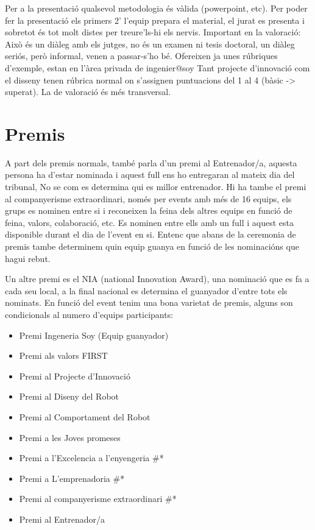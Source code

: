 \documentclass{article}
\begin{document}
\hfill \break\hfill \break
Per a la presentació qualsevol metodologia és vàlida (powerpoint, etc). Per poder fer la presentació els primers 2' l’equip prepara el material, el jurat es presenta i sobretot és tot molt distes per treure'ls-hi els nervis. Important en la valoració: Això és un diàleg amb els jutges, no és un examen ni tesis doctoral, un diàleg seriós, però informal, venen a passar-s’ho bé. 
\hfill \break\hfill \break
Ofereixen ja unes rúbriques d’exemple, estan en l’àrea privada de ingenier@soy
\hfill \break\hfill \break
Tant projecte d’innovació com el disseny tenen rúbrica normal on s'assignen puntuacions del 1 al 4 (bàsic -> superat). La de valoració és més transversal.

\section{Premis}


A part dels premis normals, també parla d’un premi al Entrenador/a, aquesta persona ha d’estar nominada i aquest full ens ho entregaran al mateix dia del tribunal, No se com es determina qui es millor entrenador. 
\hfill \break\hfill \break
Hi ha tambe el premi al companyerisme extraordinari, només per events amb més de 16 equips, els grups es nominen entre si i reconeixen la feina dels altres equips en funció de feina, valors, colaboració, etc. Es nominen entre ells amb un full i aquest esta disponible durant el dia de l’event en si. Entenc que abans de la ceremonia de premis tambe determinem quin equip guanya en funció de les nominacións que hagui rebut. 

Un altre premi es el NIA (national Innovation Award), una nominació que es fa a cada seu local, a la final nacional es determina el guanyador d’entre tots els nominats.
\hfill \break\hfill \break
En funció del event tenim una bona varietat de premis, alguns son condicionals al numero d’equips participants:

\begin{itemize}
    \item Premi Ingeneria Soy (Equip guanyador)
    \item Premi als valors FIRST
    \item Premi al Projecte d’Innovació
    \item Premi al Diseny del Robot
    \item Premi al Comportament del Robot
    \item Premi a les Joves promeses
    \item Premi a l’Excelencia a l’enyengeria \#*
    \item Premi a L’emprenadoria \#*
    \item Premi al companyerisme extraordinari \#*
    \item Premi al Entrenador/a
\end{itemize}
\end{document}
